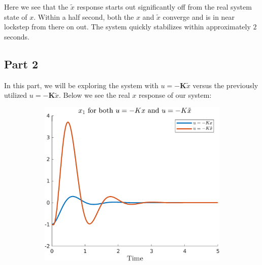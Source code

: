 \documentclass{article}
\begin{document}
Here we see that the $\tilde{x}$ response starts out significantly off from the real system state of $x$. Within a half second, both the $x$ and $\tilde{x}$ converge and is in near lockstep from there on out. The system quickly stabilizes within approximately $2$ seconds.

\subsection*{Part 2}

In this part, we will be exploring the system with $u=-\boldsymbol{K}\tilde{x}$ versus the previously utilized $u=-\boldsymbol{K}\tilde{x}$. Below we see the real $x$ response of our system:

\begin{figure}[H]
    \centering
    \begin{subfigure}{0.325\textwidth}
        \centering
        \includegraphics[width = \textwidth]{figures/c2-x1-plot.png}
    \end{subfigure}
    \begin{subfigure}{0.325\textwidth}
        \centering

\end{subfigure}
\end{figure}
\end{document}
